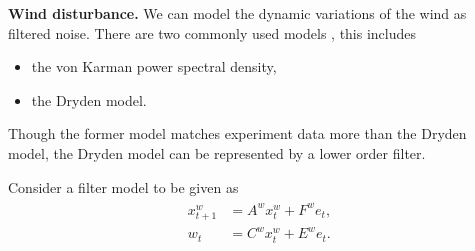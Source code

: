 \documentclass{ifacconf}
\begin{document}
 
 \noindent\textbf{Wind disturbance.}
We can model the dynamic variations of the wind as filtered noise. 
There are two commonly used models  \citep{richardson2013quantifying},  this includes
\begin{itemize}
	\item the von Karman power spectral density,
	\item the Dryden model.
\end{itemize}
 
 Though the former model matches experiment data more than the 
 Dryden model, the Dryden model can be represented by  a lower order filter.
 
Consider a filter model to be given as
\begin{align}
	\begin{aligned}
	x_{t+1}^w &= A^w x_{t}^w+ F^w e_{t},\\
	w_{t}&=C^w x_{t}^w+E^w e_{t}.
	\end{aligned}
\end{align}
\end{document}
